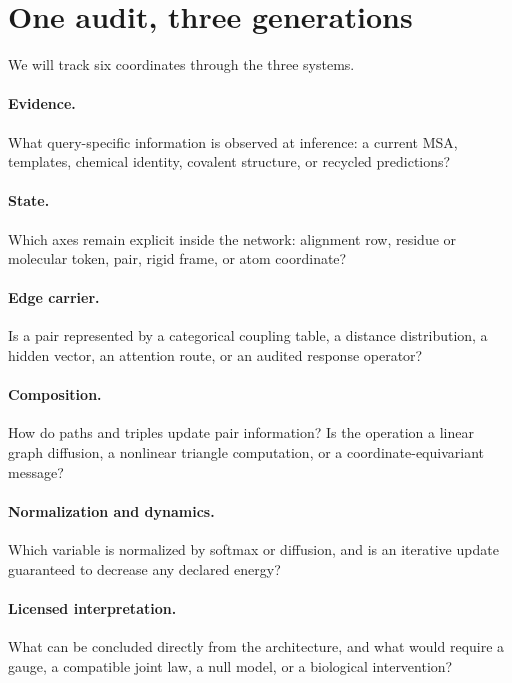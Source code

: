 \section{One audit, three generations}

We will track six coordinates through the three systems.

\paragraph{Evidence.}
What query-specific information is observed at inference: a current MSA, templates, chemical
identity, covalent structure, or recycled predictions?

\paragraph{State.}
Which axes remain explicit inside the network: alignment row, residue or molecular token, pair,
rigid frame, or atom coordinate?

\paragraph{Edge carrier.}
Is a pair represented by a categorical coupling table, a distance distribution, a hidden vector,
an attention route, or an audited response operator?

\paragraph{Composition.}
How do paths and triples update pair information?  Is the operation a linear graph diffusion, a
nonlinear triangle computation, or a coordinate-equivariant message?

\paragraph{Normalization and dynamics.}
Which variable is normalized by softmax or diffusion, and is an iterative update guaranteed to
decrease any declared energy?

\paragraph{Licensed interpretation.}
What can be concluded directly from the architecture, and what would require a gauge, a compatible
joint law, a null model, or a biological intervention?


